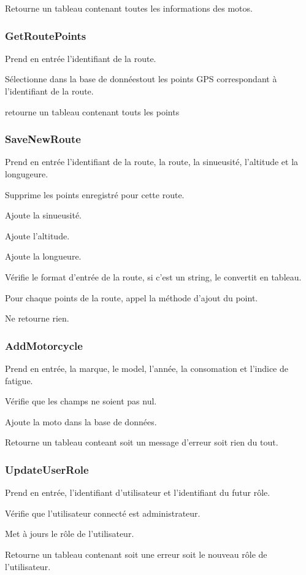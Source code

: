 \documentclass[a4paper]{article}
\newcommand{\bdd}{base de données}
\begin{document}
Retourne un tableau contenant toutes les informations des motos.

\subsubsection{GetRoutePoints}
Prend en entrée l'identifiant de la route.

Sélectionne dans la \bdd tout les points GPS correspondant à l'identifiant de la route.

retourne un tableau contenant touts les points

\subsubsection{SaveNewRoute}
Prend en entrée l'identifiant de la route, la route, la sinueusité, l'altitude et la longugeure.

Supprime les points enregistré pour cette route.

Ajoute la sinueusité.

Ajoute l'altitude.

Ajoute la longueure.

Vérifie le format d'entrée de la route, si c'est un string, le convertit en tableau.

Pour chaque points de la route, appel la méthode d'ajout du point.

Ne retourne rien.

\subsubsection{AddMotorcycle}
Prend en entrée, la marque, le model, l'année, la consomation et l'indice de fatigue.

Vérifie que les champs ne soient pas nul.

Ajoute la moto dans la \bdd.

Retourne un tableau conteant soit un message d'erreur soit rien du tout.

\subsubsection{UpdateUserRole}
Prend en entrée, l'identifiant d'utilisateur et l'identifiant du futur rôle.

Vérifie que l'utilisateur connecté est administrateur.

Met à jours le rôle de l'utilisateur.

Retourne un tableau contenant soit une erreur soit le nouveau rôle de l'utilisateur.
\end{document}
